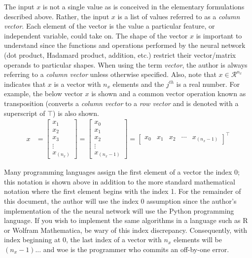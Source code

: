 \documentclass{article}
\begin{document}
The input $x$ is not a single value as is conceived in the elementary
formulations described above. Rather, the input $x$ is a list of
values referred to as a \textit{column vector}. Each element of the vector
is the value a particular feature, or independent variable, could take on.
The shape of the vector $x$ is important to understand since the functions and operations
performed by the neural network (dot product, Hadamard product, addition, etc.)
restrict their vector/matrix operands to particular shapes. When using the term
\textit{vector}, the author is always referring to a \textit{column vector}
unless otherwise specified. Also, note that $x \in \mathcal{R}^{n_x}$ indicates
that $x$ is a vector with $n_x$ elements and the $j^{th}$ is a real number.
For example, the below vector $x$ is shown and a common vector operation
known as transposition (converts a \textit{column vector} to a
\textit{row vector} and is denoted with a superscript of $\top$) is also shown.
\begin{align}
	x & = \begin{bmatrix}
		x_{1}  \\
		x_{2}  \\
		x_{3}  \\
		\vdots \\
		x_{(n_x)}
	\end{bmatrix}
	=
	\begin{bmatrix}
		x_{0}  \\
		x_{1}  \\
		x_{2}  \\
		\vdots \\
		x_{(n_{x}-1)}
	\end{bmatrix}
	=
	\begin{bmatrix}
		x_{0} & x_{1} & x_{2} & \cdots & x_{(n_{x}-1)}
	\end{bmatrix}^\top
\end{align}

Many programming languages assign the first element of a vector the index
0; this notation is shown above in addition to the more standard
mathematical notation where the first element begins with the index 1.
For the remainder of this document, the author will use the index 0 assumption
since the author's implementation of the the neural network will use the Python
programming language. If you wish to implement the same algorithms in a language
such as R or Wolfram Mathematica, be wary of this index discrepancy.
Consequently, with index beginning at 0, the last index of a vector with
$n_x$ elements will be $(n_x - 1)$... and woe is the programmer who commits an
off-by-one error.
\end{document}
